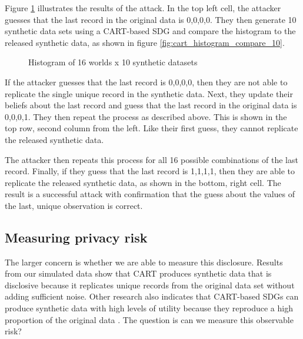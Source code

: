 \documentclass[runningheads]{llncs}
\begin{document}
Figure \ref{fig:attacker_default} illustrates the results of the attack.  In the top left cell, the attacker guesses that the last record in the original data is 0,0,0,0.  They then generate 10 synthetic data sets using a CART-based SDG and compare the histogram to the released synthetic data, as shown in figure \ref{fig:cart_histogram_compare_10}.  

\begin{figure}[!h]
    \centering
    \caption{Histogram of 16 worlds x 10 synthetic datasets}
    \label{fig:attacker_default}
\end{figure}

If the attacker guesses that the last record is 0,0,0,0, then they are not able to replicate the single unique record in the synthetic data.  Next, they update their beliefs about the last record and guess that the last record in the original data is 0,0,0,1.  They then repeat the process as described above.  This is shown in the top row, second column from the left.  Like their first guess, they cannot replicate the released synthetic data.  

The attacker then repeats this process for all 16 possible combinations of the last record.  Finally, if they guess that the last record is 1,1,1,1, then they are able to replicate the released synthetic data, as shown in the bottom, right cell.  The result is a successful attack with confirmation that the guess about the values of the last, unique observation is correct.

\subsection{Measuring privacy risk}

The larger concern is whether we are able to measure this disclosure.  Results from our simulated data show that CART produces synthetic data that is disclosive because it replicates unique records from the original data set without adding sufficient noise.  Other research also indicates that CART-based SDGs can produce synthetic data with high levels of utility because they reproduce a high proportion of the original data \cite{manrique2018bayesian}.  The question is can we measure this observable risk?
\end{document}
